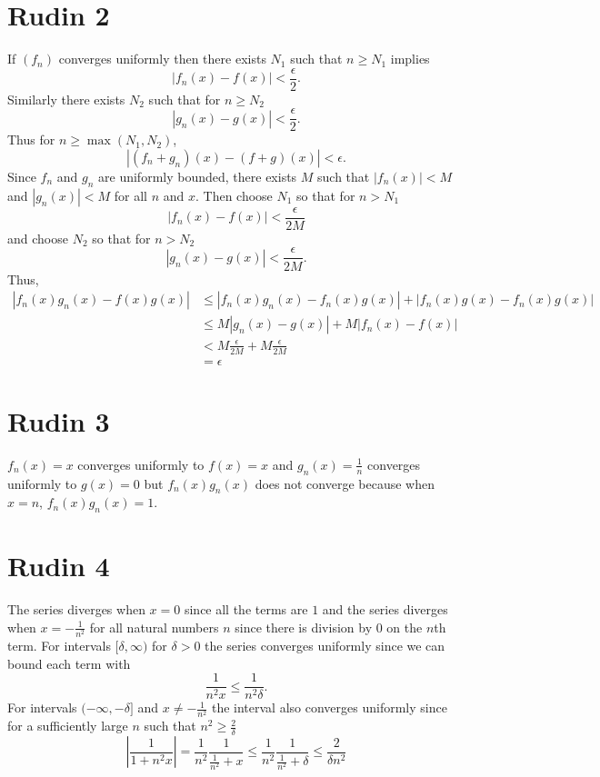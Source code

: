 \documentclass{article}
\begin{document}
\section*{Rudin 2}
If $(f_n)$ converges uniformly then there exists $N_1$ such that $n \geq N_1$ implies 
\[
	|f_n(x) - f(x)| < \frac{\epsilon}{2}.
\]
Similarly there exists $N_2$ such that for $n \geq N_2$
\[
	|g_n(x) - g(x)| < \frac{\epsilon}{2}.
\]
Thus for $n \geq \max (N_1,N_2)$,
\[
	|(f_n + g_n)(x) - (f+g)(x)| < \epsilon.
\]
Since $f_n$ and $g_n$ are uniformly bounded, there exists $M$
such that $|f_n(x)| < M$ and $|g_n(x)| < M$ for all $n$ and $x$.
Then choose $N_1$  so that for $n > N_1$
\[
	|f_n(x) - f(x)| < \frac{\epsilon}{2M}
\]
and choose $N_2$ so that for $n > N_2$
\[
	|g_n(x) - g(x)| < \frac{\epsilon}{2M}.
\]
Thus, 
\begin{align*}
	|f_n(x)g_n(x) - f(x)g(x)| &\leq |f_n(x)g_n(x) - f_n(x)g(x)| + |f_n(x)g(x) - f_n(x)g(x)| \\
	&\leq M |g_n(x) - g(x)| + M|f_n(x) - f(x)| \\
	&< M\frac{\epsilon}{2M} + M\frac{\epsilon}{2M} \\
	&= \epsilon
\end{align*}
\newpage 

\section*{Rudin 3}
$f_n(x) = x$ converges uniformly to $f(x) = x$ and 
$g_n(x) = \frac{1}{n}$ converges uniformly to $g(x) = 0$
but $f_n(x)g_n(x)$ does not converge because when $x=n$,
$f_n(x)g_n(x) = 1$.
\newpage 

\section*{Rudin 4}
The series diverges when $x=0$ since all the terms
are $1$ and the series diverges when $x = -\frac{1}{n^2}$
for all natural numbers $n$ since there is division by $0$
on the $n$th term.
For intervals $[\delta, \infty)$ for $\delta > 0$ the series converges uniformly
since we can bound each term with
\[
	\frac{1}{n^2x} \leq \frac{1}{n^2\delta}.
\]
For intervals $(-\infty, -\delta]$ and $x\neq -\frac{1}{n^2}$ the interval also converges uniformly
since for a sufficiently large $n$ such that $n^2 \geq \frac{2}{\delta}$ 
\[
	\left|\frac{1}{1+n^2x} \right| = \frac{1}{n^2}\frac{1}{\frac{1}{n^2}+x} 
	\leq \frac{1}{n^2}\frac{1}{\frac{1}{n^2}+\delta}
	\leq \frac{2}{\delta n^2} 
\]
\newpage 
\end{document}
